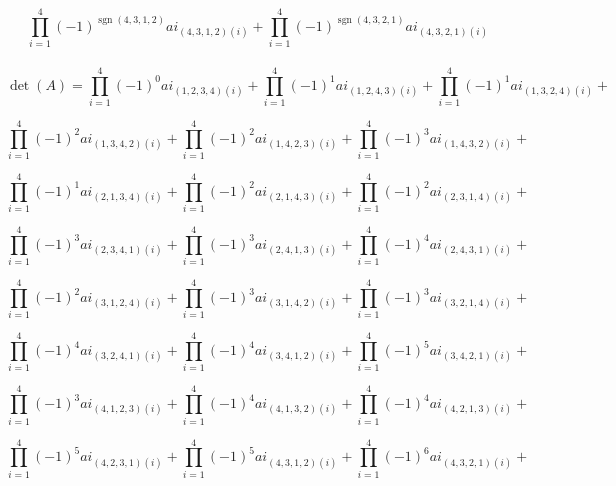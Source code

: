\documentclass[12pt]{article}
\begin{document}
    $$\prod_{i=1}^{4} (-1)^ {\operatorname{sgn}(4, 3, 1, 2)}  ai_{(4, 3, 1, 2) (i)} + 
    \prod_{i=1}^{4} (-1)^ {\operatorname{sgn}(4, 3, 2, 1)}  ai_{(4, 3, 2, 1) (i)} $$

\newpage

\paragraph{}
    $$\operatorname{det}(A)= \prod_{i=1}^{4} (-1)^0  ai_{(1, 2, 3, 4) (i)} + 
    \prod_{i=1}^{4} (-1)^1  ai_{(1, 2, 4, 3) (i)} +
    \prod_{i=1}^{4} (-1)^1  ai_{(1, 3, 2, 4) (i)} +$$
    
    $$\prod_{i=1}^{4} (-1)^2  ai_{ (1, 3, 4, 2) (i)} + 
    \prod_{i=1}^{4} (-1)^2  ai_{ (1, 4, 2, 3) (i)} +
    \prod_{i=1}^{4} (-1)^3  ai_{ (1, 4, 3, 2) (i)} +$$
    
    $$\prod_{i=1}^{4} (-1)^1  ai_{(2, 1, 3, 4) (i)} + 
    \prod_{i=1}^{4} (-1)^2  ai_{(2, 1, 4, 3) (i)} +
    \prod_{i=1}^{4} (-1)^2  ai_{(2, 3, 1, 4) (i)} +$$
    
    $$\prod_{i=1}^{4} (-1)^3  ai_{(2, 3, 4, 1) (i)} + 
    \prod_{i=1}^{4} (-1)^3  ai_{(2, 4, 1, 3) (i)} +
    \prod_{i=1}^{4} (-1)^4  ai_{(2, 4, 3, 1) (i)} +$$
    
    $$\prod_{i=1}^{4} (-1)^2  ai_{(3, 1, 2, 4) (i)} + 
    \prod_{i=1}^{4} (-1)^3  ai_{(3, 1, 4, 2) (i)} +
    \prod_{i=1}^{4} (-1)^3  ai_{(3, 2, 1, 4) (i)} +$$
    
    $$\prod_{i=1}^{4} (-1)^4  ai_{(3, 2, 4, 1) (i)} + 
    \prod_{i=1}^{4} (-1)^4  ai_{(3, 4, 1, 2) (i)} +
    \prod_{i=1}^{4} (-1)^5  ai_{(3, 4, 2, 1)(i)} +$$
    
    $$\prod_{i=1}^{4} (-1)^3  ai_{(4, 1, 2, 3) (i)} + 
    \prod_{i=1}^{4} (-1)^4  ai_{(4, 1, 3, 2) (i)} +
    \prod_{i=1}^{4} (-1)^4  ai_{(4, 2, 1, 3) (i)} +$$
    
    $$\prod_{i=1}^{4} (-1)^5  ai_{(4, 2, 3, 1) (i)} + 
    \prod_{i=1}^{4} (-1)^5  ai_{(4, 3, 1, 2) (i)} +
    \prod_{i=1}^{4} (-1)^6  ai_{(4, 3, 2, 1) (i)} +$$

\newpage

\end{document}
